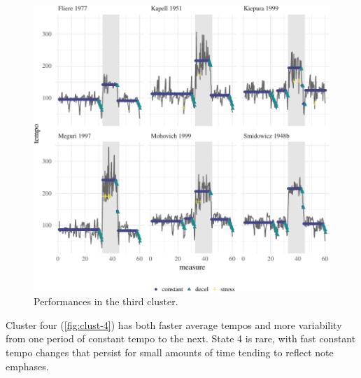 \documentclass[12pt]{article}
\begin{document}
\begin{figure}

{\centering \includegraphics{gfx/clust-3-1} 

}

\caption{Performances in the third cluster.}\label{fig:clust-3}
\end{figure}

Cluster four (\autoref{fig:clust-4}) has both faster average tempos and
more variability from one period of constant tempo to the next. State 4
is rare, with fast constant tempo changes that persist for small amounts
of time tending to reflect note emphases.
\end{document}
